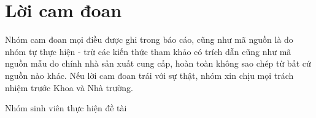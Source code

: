 \chapter*{Lời cam đoan}
\vspace{1.0cm}
Nhóm cam đoan mọi điều được ghi trong báo cáo, cũng như mã nguồn là do nhóm tự thực hiện - trừ các kiến thức tham khảo có trích dẫn cũng như mã nguồn mẫu do chính nhà sản xuất cung cấp, hoàn toàn không sao chép từ bất cứ nguồn nào khác. Nếu lời cam đoan trái với sự thật, nhóm xin chịu mọi trách nhiệm trước Khoa và Nhà trường.
\begin{flushright}
Nhóm sinh viên thực hiện đề tài 
\end{flushright}


\bigskip
 
